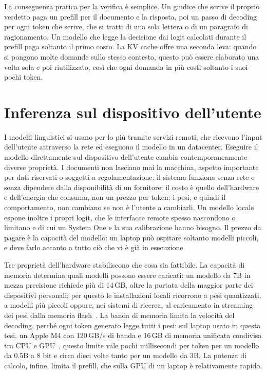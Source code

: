 La conseguenza pratica per la verifica è semplice. Un giudice che scrive il proprio verdetto paga un prefill per il
documento e la risposta, poi un passo di decoding per ogni token che scrive, che si tratti di una sola lettera o di un
paragrafo di ragionamento. Un modello che legge la decisione dai logit calcolati durante il prefill paga soltanto il
primo costo. La KV cache offre una seconda leva: quando si pongono molte domande sullo stesso contesto, questo può essere
elaborato una volta sola e poi riutilizzato, così che ogni domanda in più costi soltanto i suoi pochi token.

\section{Inferenza sul dispositivo dell'utente}
\label{sec:bg-local}

I modelli linguistici si usano per lo più tramite servizi remoti, che ricevono l'input dell'utente attraverso la rete ed
eseguono il modello in un datacenter. Eseguire il modello direttamente sul dispositivo dell'utente cambia
contemporaneamente diverse proprietà. I documenti non lasciano mai la macchina, aspetto importante per dati riservati o
soggetti a regolamentazione; il sistema funziona senza rete e senza dipendere dalla disponibilità di un fornitore; il
costo è quello dell'hardware e dell'energia che consuma, non un prezzo per token; i pesi, e quindi il comportamento, non
cambiano se non è l'utente a cambiarli. Un modello locale espone inoltre i propri logit, che le interfacce remote spesso
nascondono o limitano e di cui un System One e la sua calibrazione hanno bisogno. Il prezzo da pagare è la capacità del
modello: un laptop può ospitare soltanto modelli piccoli, e deve farlo accanto a tutto ciò che vi è già in esecuzione.

Tre proprietà dell'hardware stabiliscono che cosa sia fattibile. La capacità di memoria determina quali modelli possono
essere caricati: un modello da 7B in mezza precisione richiede più di 14\,GB, oltre la portata della maggior parte dei
dispositivi personali; per questo le installazioni locali ricorrono a pesi quantizzati, a modelli più piccoli oppure, nei
sistemi di ricerca, al caricamento in streaming dei pesi dalla memoria flash~\cite{alizadeh2024flash}. La banda di
memoria limita la velocità del decoding, perché ogni token generato legge tutti i pesi: sul laptop usato in questa tesi,
un Apple M4 con 120\,GB/s di banda e 16\,GB di memoria unificata condivisa tra CPU e GPU~\cite{apple2024m4specs}, questo
limite vale pochi millisecondi per token per un modello da 0.5B a 8 bit e circa dieci volte tanto per un modello da 3B.
La potenza di calcolo, infine, limita il prefill, che sulla GPU di un laptop è relativamente rapido.

